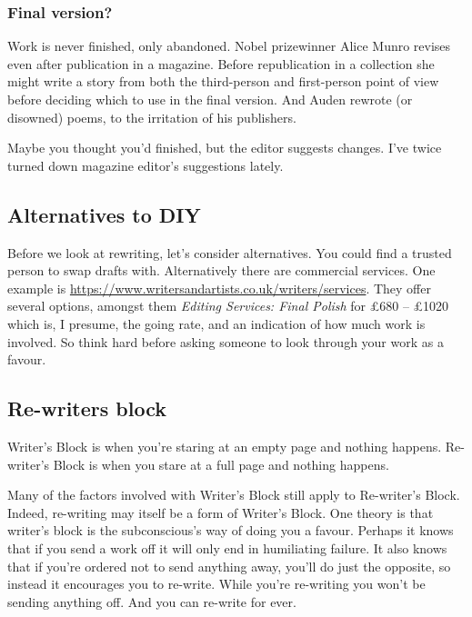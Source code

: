\documentclass[11pt]{article}
\begin{document}


\subsubsection*{Final version?}
Work is never finished, only abandoned. Nobel prizewinner Alice Munro revises even after publication in a magazine. Before republication in a collection she might write a story from both the third-person and first-person point of view before deciding which to use in the final version. And Auden 
rewrote (or disowned) poems, to the irritation of his publishers.

Maybe you thought you'd finished, but the editor suggests changes. I've twice
turned down magazine editor's suggestions lately.


\subsection*{Alternatives to DIY}
Before we look at rewriting, let's consider alternatives. You could
find a trusted person to swap drafts with. Alternatively 
there are commercial services. One example is \url{https://www.writersandartists.co.uk/writers/services}. They offer several options, amongst them \textit{Editing Services: Final Polish} for £680 – £1020 which is, I presume, the going rate, and an indication of how much work is involved. So think hard before asking someone to look through your work as a favour.


\subsection*{Re-writers block}
Writer's Block is when you're staring at an empty page and nothing happens. Re-writer's Block is when you stare at a full page and nothing happens.

Many of the factors involved with Writer's Block still apply to Re-writer's Block. Indeed, re-writing may itself be a form of Writer's Block. One theory is that writer's block is the subconscious's way of doing you a favour. Perhaps it knows that if you send a work off it will only end in humiliating failure. It also knows that if you're ordered not to send anything away, you'll do just the opposite, so instead it encourages you to re-write. While you're re-writing you won't be sending anything off. And you can re-write for ever.

\end{document}
